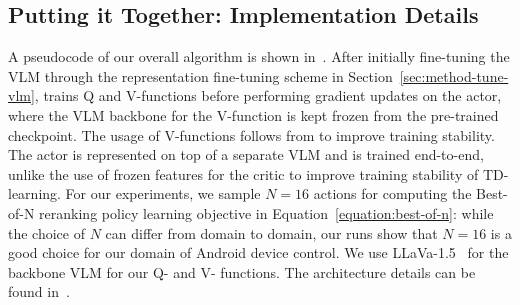 \vspace{-0.1cm}
\subsection{Putting it Together: Implementation Details}
\vspace{-0.1cm}
A pseudocode of our overall algorithm is shown in~. After initially fine-tuning the VLM through the representation fine-tuning scheme in Section~\ref{sec:method-tune-vlm}, \ourmethod{} trains Q and V-functions before performing gradient updates on the actor, where the VLM backbone for the V-function is kept frozen from the pre-trained checkpoint. The usage of V-functions follows from \citet{zhou2024archertraininglanguagemodel, snell2023offlinerlnaturallanguage} to improve training stability.
The actor is represented on top of a separate VLM and is trained end-to-end, unlike the use of frozen features for the critic to improve training stability of TD-learning. For our experiments, we sample $N=16$ actions for computing the Best-of-N reranking policy learning objective in Equation~\ref{equation:best-of-n}: while the choice of $N$ can differ from domain to domain, our runs show that $N=16$ is a good choice for our domain of Android device control. We use LLaVa-1.5~\citep{liu2024improvedbaselinesvisualinstruction} for the backbone VLM for our Q- and V- functions. The architecture details can be found in~.
